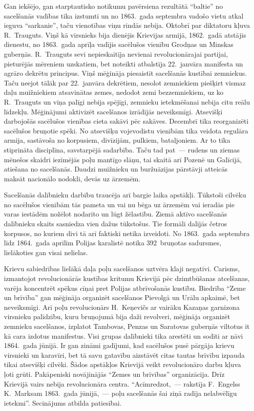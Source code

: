 \documentclass[twoside,a5paper,12pt,fleqn,openany]{extbook}
\begin{document}
Gan iekšējo, gan starptautisko notikumu pavērsiena rezultātā ``baltie'' no sacelšanās vadības tika izstumti un no 1863.~gada septembra vadošo vietu atkal ieguva ``sarkanie'', taču vienotības viņu rindās nebija. Oktobrī par diktatoru kļuva R.~Trauguts. Viņš kā virsnieks bija dienējis Krievijas armijā, 1862.~gadā atstājis dienestu, no 1863.~gada aprīļa vadījis sacēlušos vienību Grodņas un Minskas guberņās. R.~Trauguts sevi nepieskaitīja nevienai revolucionārajai partijai, pieturējās mēreniem uzskatiem, bet noteikti atbalstīja 22.~janvāra manifesta un agrāro dekrētu principus. Viņš mēģināja piesaistīt sacelšanās kustībai zemniekus. Taču neejot tālāk par 22.~janvāra dekrētiem, nesolot zemniekiem piešķirt vismaz daļu muižniekiem atsavinātas zemes, nedodot zemi bezzemniekiem, uz ko R.~Trauguts un viņa palīgi nebija spējīgi, zemnieku ietekmēšanai nebija citu reālu līdzekļu. Mēģinājumi aktivizēt sacelšanos izrādījās neveiksmīgi. Atsevišķi darbojošās sacēlušos vienības cieta sakāvi pēc sakāves. Decembrī tika reorganizēti sacēlušos bruņotie spēki. No atsevišķu vojevodistu vienībām tika veidota regulāra armija, sastāvoša no korpusiem, divīzijām, pulkiem, bataljoniem. Ar to tika stiprināta disciplīna, savstarpējā sadarbība. Taču tad pat~--- rudens un ziemas mēnešos skaidri iezīmējās poļu mantīgo slāņu, tai skaitā arī Pozenē un Galīcijā, atiešana no sacelšanās. Daudzi muižnieku un buržuāzijas pārstāvji atteicās maksāt nacionālo nodokli, devās uz ārzemēm.

Sacelšanās dalībnieku darbību traucēja arī bargie laika apstākļi. Tūkstoši cilvēku no sacēlušos vienībām tās pameta un vai nu bēga uz ārzemēm vai ieradās pie varas iestādēm nožēlot nodarīto un lūgt žēlastību. Ziemā aktīvo sacelšanās dalībnieku skaits sasniedza vien dažus tūkstošus. Tie formāli dalījās četros korpusos, no kuriem divi tā arī faktiski netika izveidoti. No 1863.~gada septembra līdz 1864.~gada aprīlim Polijas karalistē notika 392~bruņotas sadursmes, lielākoties gan visai nelielas.

Krievu sabiedrības lielākā daļa poļu sacelšanos uztvēra klaji negatīvi. Carisms, izmantojot revolucionārās kustības kritumu Krievijā pēc dzimtbūšanas atcelšanas, varēja koncentrēt spēkus cīņai pret Polijas atbrīvošanās kustību. Biedrība ``Zeme un brīvība'' gan mēģināja organizēt sacelšanos Pievolgā un Urālu apkaimē, bet neveiksmīgi. Arī poļu revolucionārs H.~Keņevičs ar vairāku Kazaņas garnizona virsnieku palīdzību, kuru bruņojumā bija daži revolveri, mēģināja organizēt zemnieku sacelšanos, izplatot Tambovas, Penzas un Saratovas guberņās viltotus it kā cara izdotus manifestus. Visi grupas dalībnieki tika arestēti un sodīti ar nāvi 1864.~gada jūnijā. Ir gan zināmi gadījumi, kad sacēlušos pusē pārgāja krievu virsnieki un karavīri, bet tā savu gatavību aizstāvēt citas tautas brīvību izpauda tikai atsevišķi cilvēki. Šādos apstākļos Krievijā veikt revolucionāro darbu kļuva ļoti grūti. Pakāpeniski novājinājās ``Zemes un brīvības'' organizācija. Drīz Krievijā vairs nebija revolucionāra centra. ``Acīmredzot,~--- rakstīja F.~Engelss K.~Marksam 1863.~gada jūnijā,~--- poļu sacelšanās šai ziņā radīja nelabvēlīgu ietekmi''. Secinājums atbilda patiesībai.
\end{document}

